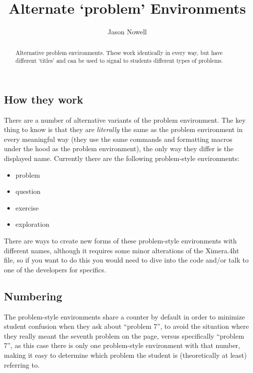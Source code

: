 \documentclass{ximera}
\title{Alternate `problem' Environments}
\author{Jason Nowell}
\begin{document}
\begin{abstract}
    Alternative problem environments. These work identically in every way, but have different `titles' and can be used to signal to students different types of problems.
\end{abstract}
\maketitle

    \subsection*{How they work}
        
        There are a number of alternative variants of the problem environment. The key thing to know is that they are \textit{literally} the same as the problem environment in every meaningful way (they use the same commands and formatting macros under the hood as the problem environment), the only way they differ is the displayed name. Currently there are the following problem-style environments:
        
        \begin{itemize}
            \item problem
            \item question
            \item exercise
            \item exploration
        \end{itemize}
        
        There are ways to create new forms of these problem-style environments with different names, although it requires some minor alterations of the Ximera.4ht file, so if you want to do this you would need to dive into the code and/or talk to one of the developers for specifics.
    
    \subsection*{Numbering}
    
        The problem-style environments share a counter by default in order to minimize student confusion when they ask about ``problem 7'', to avoid the situation where they really meant the seventh problem on the page, versus specifically ``problem 7'', as this case there is only one problem-style environment with that number, making it easy to determine which problem the student is (theoretically at least) referring to.
    
\end{document}
